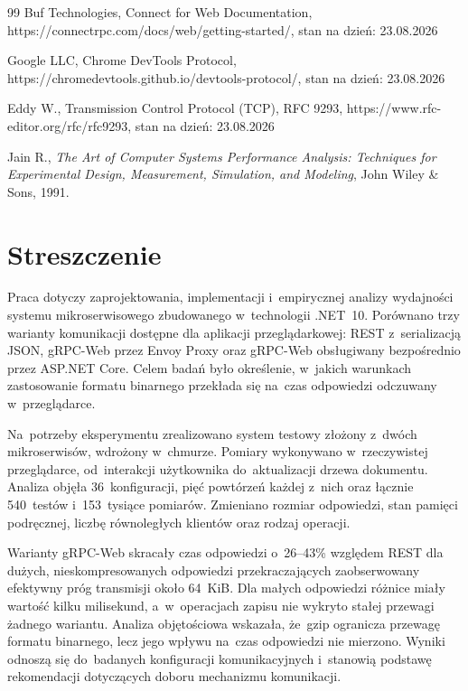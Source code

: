 \documentclass{PracaDyplomowa}
\begin{document}
\begin{thebibliography}{99}
 Buf Technologies, Connect for Web Documentation, https://connectrpc.com/docs/web/getting-started/, stan na dzień: 23.08.2026

 Google LLC, Chrome DevTools Protocol, https://chromedevtools.github.io/devtools-protocol/, stan na dzień: 23.08.2026

 Eddy W., Transmission Control Protocol (TCP), RFC 9293, https://www.rfc-editor.org/rfc/rfc9293, stan na dzień: 23.08.2026

 Jain R., \textit{The Art of Computer Systems Performance Analysis: Techniques for Experimental Design, Measurement, Simulation, and Modeling}, John Wiley \& Sons, 1991.

\end{thebibliography}

\listoffigures
{}

\listoftables
{}

\lstlistoflistings
{}

\chapter*{Streszczenie}

Praca dotyczy zaprojektowania, implementacji i~empirycznej analizy wydajności systemu mikroserwisowego zbudowanego w~technologii .NET~10. Porównano trzy warianty komunikacji dostępne dla aplikacji przeglądarkowej: REST z~serializacją JSON, gRPC-Web przez Envoy Proxy oraz gRPC-Web obsługiwany bezpośrednio przez ASP.NET Core. Celem badań było określenie, w~jakich warunkach zastosowanie formatu binarnego przekłada się na~czas odpowiedzi odczuwany w~przeglądarce.

Na~potrzeby eksperymentu zrealizowano system testowy złożony z~dwóch mikroserwisów, wdrożony w~chmurze. Pomiary wykonywano w~rzeczywistej przeglądarce, od~interakcji użytkownika do~aktualizacji drzewa dokumentu. Analiza objęła 36~konfiguracji, pięć powtórzeń każdej z~nich oraz łącznie 540~testów i~153~tysiące pomiarów. Zmieniano rozmiar odpowiedzi, stan pamięci podręcznej, liczbę równoległych klientów oraz rodzaj operacji.

Warianty gRPC-Web skracały czas odpowiedzi o~26--43\% względem REST dla dużych, nieskompresowanych odpowiedzi przekraczających zaobserwowany efektywny próg transmisji około 64~KiB. Dla małych odpowiedzi różnice miały wartość kilku milisekund, a~w~operacjach zapisu nie wykryto stałej przewagi żadnego wariantu. Analiza objętościowa wskazała, że~gzip ogranicza przewagę formatu binarnego, lecz jego wpływu na~czas odpowiedzi nie mierzono. Wyniki odnoszą się do~badanych konfiguracji komunikacyjnych i~stanowią podstawę rekomendacji dotyczących doboru mechanizmu komunikacji.
\end{document}
